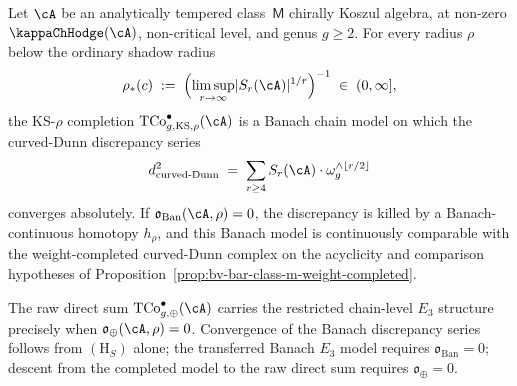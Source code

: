 \begin{theorem}
\label{thm:chain-level-e3-original-complex-conditional}
Let $\cA$ be an analytically tempered class~$\mathsf{M}$ chirally
Koszul algebra, at non-zero $\kappaChHodge(\cA)$, non-critical level, and
genus $g \ge 2$. For every radius $\rho$ below the ordinary shadow
radius
\[
 \rho_*(c)
 \;:=\;
 \Bigl( \limsup_{r \to \infty}
 \lvert S_r(\cA) \rvert^{1/r} \Bigr)^{-1}
 \;\in\;
 (0, \infty],
\]
the KS-$\rho$ completion
$\mathrm{TCo}^{\bullet}_{g,\mathrm{KS},\rho}(\cA)$ is a Banach
chain model on which the curved-Dunn discrepancy series
\[
 d^2_{\mathrm{curved\text{-}Dunn}}
 \;=\;
 \sum_{r \ge 4} S_r(\cA) \cdot \omega_g^{\wedge \lfloor r/2 \rfloor}
\]
converges absolutely. If
$\mathfrak{o}_{\mathrm{Ban}}(\cA,\rho)=0$, the discrepancy is killed
by a Banach-continuous homotopy $h_\rho$, and this Banach model is
continuously comparable with the weight-completed curved-Dunn complex
on the acyclicity and comparison hypotheses of
Proposition~\ref{prop:bv-bar-class-m-weight-completed}.

The raw direct sum
$\mathrm{TCo}^{\bullet}_{g,\oplus}(\cA)$ carries the restricted
chain-level $E_3$ structure precisely when
$\mathfrak{o}_{\oplus}(\cA,\rho)=0$. Convergence of the Banach
discrepancy series follows from $(\mathrm{H}_S)$ alone; the transferred
Banach $E_3$ model requires $\mathfrak{o}_{\mathrm{Ban}}=0$; descent
from the completed model to the raw direct sum requires
$\mathfrak{o}_{\oplus}=0$.
\end{theorem}

